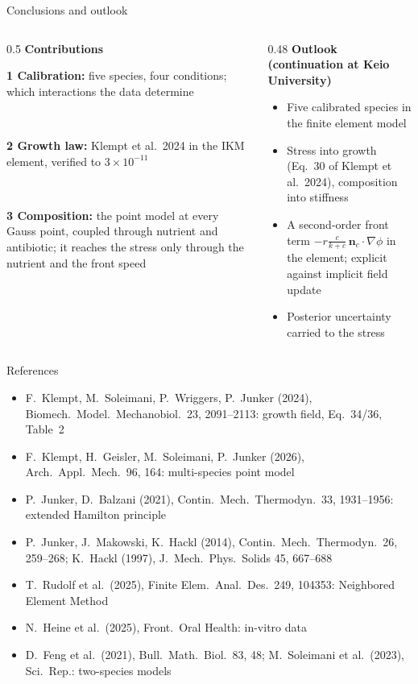 \documentclass[aspectratio=169,11pt]{beamer}
\newcommand{\cbox}[3]{\colorbox{#1!8}{\parbox[t][#2][t]{\dimexpr\linewidth-2\fboxsep}{\raggedright #3}}}
\newcommand{\fterm}{\ensuremath{-r\tfrac{c}{k+c}\,\mathbf n_c\cdot\nabla \phi}}
\begin{document}
\begin{frame}{Conclusions and outlook}
\begin{columns}[T]
\begin{column}{0.5\textwidth}
\textbf{Contributions}\\[5pt]
\cbox{p1}{1.4cm}{\textbf{\color{p1}1 Calibration:} five species, four conditions; which interactions the data determine}\\[6pt]
\cbox{p2}{1.4cm}{\textbf{\color{p2}2 Growth law:} Klempt et al.\ 2024 in the IKM element, verified to $3\times10^{-11}$}\\[6pt]
\cbox{p3}{1.4cm}{\textbf{\color{p3}3 Composition:} the point model at every Gauss point, coupled through nutrient and antibiotic; it reaches the stress only through the nutrient and the front speed}
\end{column}
\begin{column}{0.48\textwidth}
\textbf{Outlook (continuation at Keio University)}\\[6pt]
\begin{itemize}\setlength{\itemsep}{8pt}
  \item Five calibrated species in the finite element model
    \item Stress into growth (Eq.~30 of Klempt et al.\ 2024), composition into stiffness
  \item A second-order front term \fterm{} in the element; explicit against implicit field update
  \item Posterior uncertainty carried to the stress
\end{itemize}
\end{column}
\end{columns}
\end{frame}

\begin{frame}{References}
\footnotesize
\begin{itemize}
  \item F.~Klempt, M.~Soleimani, P.~Wriggers, P.~Junker (2024), Biomech.\
        Model.\ Mechanobiol.\ 23, 2091--2113: growth field, Eq.~34/36, Table~2
  \item F.~Klempt, H.~Geisler, M.~Soleimani, P.~Junker (2026), Arch.\ Appl.\
        Mech.\ 96, 164: multi-species point model
  \item P.~Junker, D.~Balzani (2021), Contin.\ Mech.\ Thermodyn.\ 33,
        1931--1956: extended Hamilton principle
  \item P.~Junker, J.~Makowski, K.~Hackl (2014), Contin.\ Mech.\ Thermodyn.\
        26, 259--268; K.~Hackl (1997), J.\ Mech.\ Phys.\ Solids 45, 667--688
  \item T.~Rudolf et al.\ (2025), Finite Elem.\ Anal.\ Des.\ 249, 104353:
        Neighbored Element Method
  \item N.~Heine et al.\ (2025), Front.\ Oral Health: in-vitro data
  \item D.~Feng et al.\ (2021), Bull.\ Math.\ Biol.\ 83, 48;
        M.~Soleimani et al.\ (2023), Sci.\ Rep.: two-species models
\end{itemize}
\end{frame}
\end{document}
